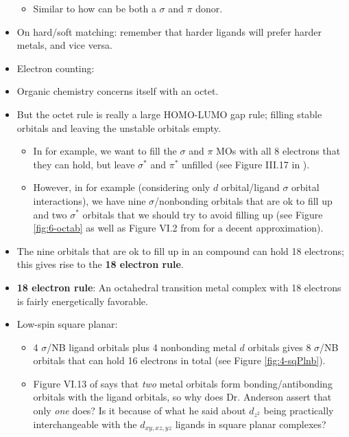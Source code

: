 \documentclass[../notes.tex]{subfiles}
\begin{document}
\begin{itemize}
    \begin{itemize}
        \item Similar to how  can be both a $\sigma$ and $\pi$ donor.
    \end{itemize}
    \item On hard/soft matching: remember that harder ligands will prefer harder metals, and vice versa.
    \item Electron counting:
    \item Organic chemistry concerns itself with an octet.
    \item But the octet rule is really a large HOMO-LUMO gap rule; filling stable orbitals and leaving the unstable orbitals empty.
    \begin{itemize}
        \item In  for example, we want to fill the $\sigma$ and $\pi$ MOs with all 8 electrons that they can hold, but leave $\sigma^*$ and $\pi^*$ unfilled (see Figure III.17 in \textcite{bib:CHEM20100Notes}).
        \item However, in  for example (considering only $d$ orbital/ligand $\sigma$ orbital interactions), we have nine $\sigma$/nonbonding orbitals that are ok to fill up and two $\sigma^*$ orbitals that we should try to avoid filling up (see Figure \ref{fig:6-octab} as well as Figure VI.2 from \textcite{bib:CHEM20100Notes} for a decent approximation).
    \end{itemize}
    \item The nine orbitals that are ok to fill up in an  compound can hold 18 electrons; this gives rise to the \textbf{18 electron rule}.
    \item \textbf{18 electron rule}: An octahedral  transition metal complex with 18 electrons is fairly energetically favorable.
    \item Low-spin square planar:
    \begin{itemize}
        \item 4 $\sigma$/NB ligand orbitals plus 4 nonbonding metal $d$ orbitals gives 8 $\sigma$/NB orbitals that can hold 16 electrons in total (see Figure \ref{fig:4-sqPlnb}).
        \item Figure VI.13 of \textcite{bib:CHEM20100Notes} says that \emph{two} metal orbitals form bonding/antibonding orbitals with the ligand orbitals, so why does Dr. Anderson assert that only \emph{one} does? Is it because of what he said about $d_{z^2}$ being practically interchangeable with the $d_{xy,xz,yz}$ ligands in square planar complexes?

\end{itemize}
\end{itemize}
\end{document}
